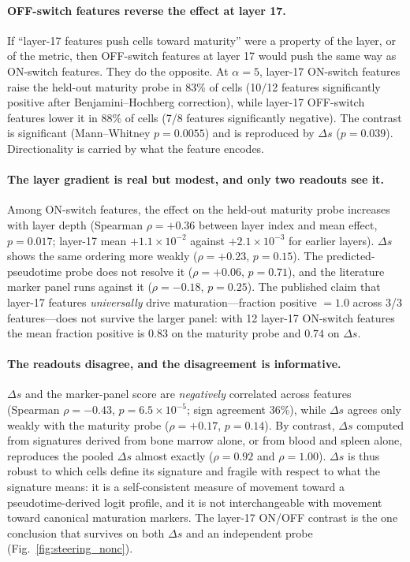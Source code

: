 \documentclass[11pt,onecolumn]{article}
\begin{document}
\paragraph{OFF-switch features reverse the effect at layer 17.}
If ``layer-17 features push cells toward maturity'' were a property of the layer, or of the metric, then OFF-switch features at layer 17 would push the same way as ON-switch features. They do the opposite. At $\alpha=5$, layer-17 ON-switch features raise the held-out maturity probe in 83\% of cells (10/12 features significantly positive after Benjamini--Hochberg correction), while layer-17 OFF-switch features lower it in 88\% of cells (7/8 features significantly negative). The contrast is significant (Mann--Whitney $p=0.0055$) and is reproduced by $\Delta s$ ($p=0.039$). Directionality is carried by what the feature encodes.

\paragraph{The layer gradient is real but modest, and only two readouts see it.}
Among ON-switch features, the effect on the held-out maturity probe increases with layer depth (Spearman $\rho=+0.36$ between layer index and mean effect, $p=0.017$; layer-17 mean $+1.1\times10^{-2}$ against $+2.1\times10^{-3}$ for earlier layers). $\Delta s$ shows the same ordering more weakly ($\rho=+0.23$, $p=0.15$). The predicted-pseudotime probe does not resolve it ($\rho=+0.06$, $p=0.71$), and the literature marker panel runs against it ($\rho=-0.18$, $p=0.25$). The published claim that layer-17 features \emph{universally} drive maturation---fraction positive $=1.0$ across 3/3 features---does not survive the larger panel: with 12 layer-17 ON-switch features the mean fraction positive is $0.83$ on the maturity probe and $0.74$ on $\Delta s$.

\paragraph{The readouts disagree, and the disagreement is informative.}
$\Delta s$ and the marker-panel score are \emph{negatively} correlated across features (Spearman $\rho=-0.43$, $p=6.5\times10^{-5}$; sign agreement 36\%), while $\Delta s$ agrees only weakly with the maturity probe ($\rho=+0.17$, $p=0.14$). By contrast, $\Delta s$ computed from signatures derived from bone marrow alone, or from blood and spleen alone, reproduces the pooled $\Delta s$ almost exactly ($\rho=0.92$ and $\rho=1.00$). $\Delta s$ is thus robust to which cells define its signature and fragile with respect to what the signature means: it is a self-consistent measure of movement toward a pseudotime-derived logit profile, and it is not interchangeable with movement toward canonical maturation markers. The layer-17 ON/OFF contrast is the one conclusion that survives on both $\Delta s$ and an independent probe (Fig.~\ref{fig:steering_nonc}).
\end{document}
